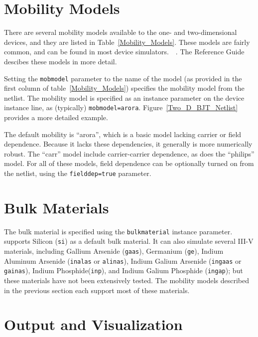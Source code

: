 \section{Mobility Models}
\label{PDE_Mobility}
There are several mobility models available to the one- and two-dimensional 
devices, and they are listed in Table~\ref{Mobility_Models}.
These models are fairly common, and can be found in most device
simulators.~\cite{Yu}~\cite{DaVinci}. The \Xyce{} Reference 
Guide\ReferenceGuide{} descibes these models in more detail.


Setting the {\texttt{mobmodel}} parameter to the name of the model (as provided 
in the first column of table~\ref{Mobility_Models}) specifies the mobility model 
from the netlist. The mobility model is specified as an instance parameter on the 
device instance line, as (typically) {\texttt {mobmodel=arora}}.
Figure~\ref{Two_D_BJT_Netlist} provides a more detailed 
example.

The default mobility is ``arora'', which is a basic model lacking carrier or field dependence.  
Because it lacks these dependencies, it generally is more numerically robust.  The ``carr'' model
include carrier-carrier dependence, as does the ``philips'' model.  For all of these models,
field dependence can be optionally turned on from the netlist, using the \texttt{fielddep=true} parameter.

\section{Bulk Materials}
\label{PDE_Bulk_Material}
The bulk material is specified using the \texttt{bulkmaterial} instance
parameter.  \Xyce{} supports Silicon (\texttt{si}) as a default bulk material.  
It can also simulate several III-V materials, including Gallium Arsenide (\texttt{gaas}), Germanium (\texttt{ge}), Indium Aluminum Arsenide (\texttt{inalas}  or \texttt{alinas}),
Indium Galium Arsenide (\texttt{ingaas} or \texttt{gainas}), Indium Phosphide(\texttt{inp}), and
Indium Galium Phosphide (\texttt{ingap}); but these materials have not been extensively tested.
The mobility models described in the previous section each support most of these materials.

\section{Output and Visualization}
\label{PDE_Output_Vis}

